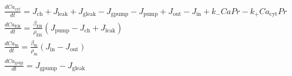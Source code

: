 \documentclass[11pt,a4paper,onecolumn]{article}
\begin{document}
\begin{align*}
  &\frac{dCa_{\text{cyt}}}{dt} = J_{\text{ch}} + J_{\text{leak}} + J_{\text{gleak}} - J_{\text{gpump}} - J_{\text{pump}} + J_{\text{out}} - J_{\text{in}} + k_-CaPr - k_+Ca_{\text{cyt}}Pr \nonumber \\
  &\frac{dCa_{\text{ER}}}{dt} = \frac{\beta_{\text{ER}}}{\rho_{\text{ER}}}(J_{\text{pump}} - J_{\text{ch}} + J_{\text{leak}}) \nonumber \\
  &\frac{dCa_{\text{m}}}{dt} = \frac{\beta_{\text{m}}}{\rho_{\text{m}}}(J_{\text{in}} - J_{\text{out}}) \nonumber \\
  &\frac{dCa_{\text{golgi}}}{dt} = J_{\text{gpump}} - J_{\text{gleak}}
\end{align*}
\end{document}

